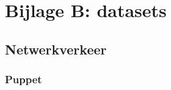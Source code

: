 


\chapter{Bijlage B: datasets}



\section{Netwerkverkeer}
\label{dataset:netwerkverkeer}
\subsection{Puppet}
\label{dataset:netwerkverkeer:puppet}
